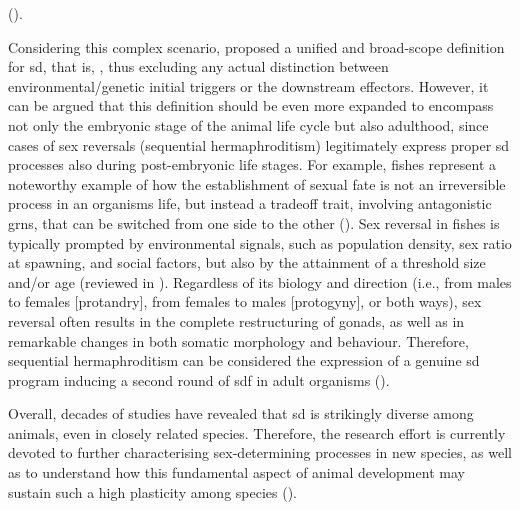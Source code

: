 ().

Considering this complex scenario,  proposed a unified and broad-scope definition for \gls{sd}, that is, , thus excluding any actual distinction between environmental/genetic initial triggers or the downstream effectors. However, it can be argued that this definition should be even more expanded to encompass not only the embryonic stage of the animal life cycle but also adulthood, since cases of sex reversals (sequential hermaphroditism) legitimately express proper \gls{sd} processes also during post-embryonic life stages. For example, fishes represent a noteworthy example of how the establishment of sexual fate is not an irreversible process in an organism\curlyapostrophe s life, but instead a tradeoff trait, involving antagonistic \glspl{grn}, that can be switched from one side to the other (). Sex reversal in fishes is typically prompted by environmental signals, such as population density, sex ratio at spawning, and social factors, but also by the attainment of a threshold size and/or age (reviewed in ). Regardless of its biology and direction (i.e., from males to females [protandry], from females to males [protogyny], or both ways), sex reversal often results in the complete restructuring of gonads, as well as in remarkable changes in both somatic morphology and behaviour. Therefore, sequential hermaphroditism can be considered the expression of a genuine \gls{sd} program inducing a second round of \gls{sdf} in adult organisms ().

Overall, decades of studies have revealed that \gls{sd} is strikingly diverse among animals, even in closely related species. Therefore, the research effort is currently devoted to further characterising sex-determining processes in new species, as well as to understand how this fundamental aspect of animal development may sustain such a high plasticity among species ().

